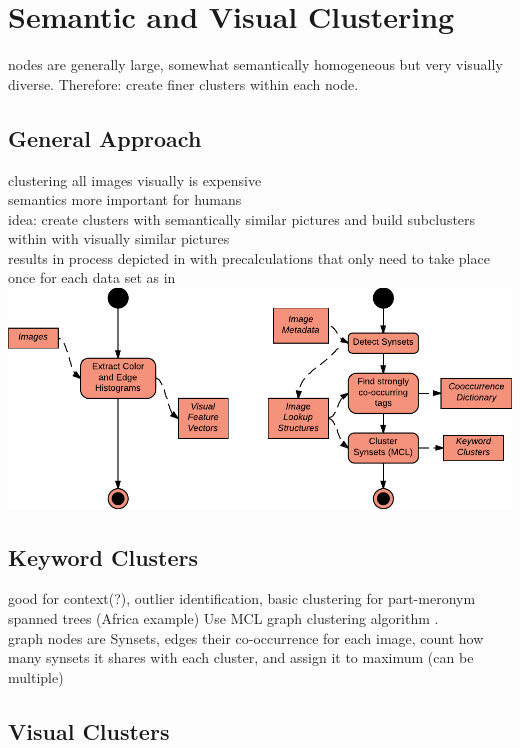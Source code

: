 %
\section{Semantic and Visual Clustering}
\label{sec_inhalt}

nodes are generally large, somewhat semantically homogeneous but very visually diverse. Therefore: create finer clusters within each node.

\subsection{General Approach}
clustering all images visually is expensive \\
semantics more important for humans \\
idea: create clusters with semantically similar pictures and build subclusters within with visually similar pictures\\
results in process depicted in 
with precalculations that only need to take place once for each data set as in\\
\includegraphics[width=\textwidth]{images/precalcs_activity_diagram.pdf}


\subsection{Keyword Clusters}
good for context(?), outlier identification, basic clustering for part-meronym spanned trees (Africa example)
\bigskip
Use MCL graph clustering algorithm\cite{Dongen1998} .\\
graph nodes are Synsets, edges their co-occurrence
\bigskip
for each image, count how many synsets it shares with each cluster, and assign it to maximum (can be multiple)

\subsection{Visual Clusters}

